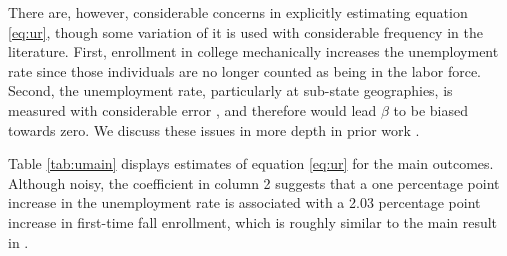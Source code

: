  There are, however, considerable concerns in explicitly estimating equation \ref{eq:ur}, though some variation of it is used with considerable frequency in the literature. First, enrollment in college mechanically increases the unemployment rate since those individuals are no longer counted as being in the labor force. Second, the unemployment rate, particularly at sub-state geographies, is measured with considerable error \citep{hoynes2000}, and therefore  would lead  $\beta$ to be biased towards zero. We discuss these issues in more depth in prior work \citep{FGS2015}.
 
 Table \ref{tab:umain} displays estimates of equation \ref{eq:ur} for the main outcomes. Although noisy, the coefficient in column 2 suggests that a one percentage point increase in the unemployment rate is associated with a 2.03 percentage point increase in first-time fall enrollment, which is roughly similar to the main result in \citet{BF1995}.


\begin{table}[h]\centering\caption{Unemployment Rate and Two-Year College Enrollment}
\def\sym#1{\ifmmode^{#1}\else\(^{#1}\)\fi}
\label{tab:umain}
\end{table}

